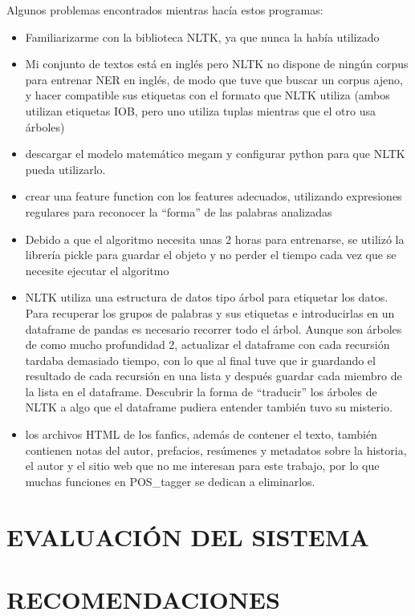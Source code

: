 \documentclass{pre-tfg}
\begin{document}
Algunos problemas encontrados mientras hacía estos programas:
\begin{itemize}
	\item Familiarizarme con la biblioteca NLTK, ya que nunca la había utilizado
	\item Mi conjunto de textos está en inglés pero NLTK no dispone de ningún corpus para entrenar NER en inglés, de modo que tuve que buscar un corpus ajeno, y hacer compatible sus etiquetas con el formato que NLTK utiliza (ambos utilizan etiquetas IOB, pero uno utiliza tuplas mientras que el otro usa árboles)
	\item descargar el modelo matemático megam y configurar python para que NLTK pueda utilizarlo.
	\item crear una feature function con los features adecuados, utilizando expresiones regulares para reconocer la “forma” de las palabras analizadas
	\item Debido a que el algoritmo necesita unas 2 horas para entrenarse, se utilizó la librería pickle para guardar el objeto y no perder el tiempo cada vez que se necesite ejecutar el algoritmo
	\item NLTK utiliza una estructura de datos tipo árbol para etiquetar los datos. Para recuperar los grupos de palabras y sus etiquetas e introducirlas en un dataframe de pandas es necesario recorrer todo el árbol. Aunque son árboles de como mucho profundidad 2, actualizar el dataframe con cada recursión tardaba demasiado tiempo, con lo que al final tuve que ir guardando el resultado de cada recursión en una lista y después guardar cada miembro de la lista en el dataframe. Descubrir la forma de “traducir” los árboles de NLTK a algo que el dataframe pudiera entender también tuvo su misterio.
	\item los archivos HTML de los fanfics, además de contener el texto, también contienen notas del autor, prefacios, resúmenes y metadatos sobre la historia, el autor y el sitio web que no me interesan para este trabajo, por lo que muchas funciones en POS\_tagger se dedican a eliminarlos.
\end{itemize}

\section{EVALUACIÓN DEL SISTEMA}

\section{RECOMENDACIONES}
\end{document}

